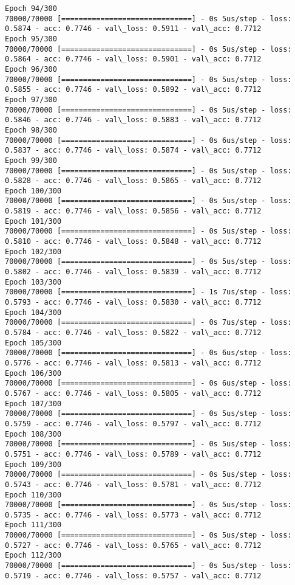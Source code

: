 \documentclass[11pt]{article}
\begin{document}
\begin{Verbatim}[commandchars=\\\{\}]
Epoch 94/300
70000/70000 [==============================] - 0s 5us/step - loss: 0.5874 - acc: 0.7746 - val\_loss: 0.5911 - val\_acc: 0.7712
Epoch 95/300
70000/70000 [==============================] - 0s 5us/step - loss: 0.5864 - acc: 0.7746 - val\_loss: 0.5901 - val\_acc: 0.7712
Epoch 96/300
70000/70000 [==============================] - 0s 5us/step - loss: 0.5855 - acc: 0.7746 - val\_loss: 0.5892 - val\_acc: 0.7712
Epoch 97/300
70000/70000 [==============================] - 0s 5us/step - loss: 0.5846 - acc: 0.7746 - val\_loss: 0.5883 - val\_acc: 0.7712
Epoch 98/300
70000/70000 [==============================] - 0s 6us/step - loss: 0.5837 - acc: 0.7746 - val\_loss: 0.5874 - val\_acc: 0.7712
Epoch 99/300
70000/70000 [==============================] - 0s 5us/step - loss: 0.5828 - acc: 0.7746 - val\_loss: 0.5865 - val\_acc: 0.7712
Epoch 100/300
70000/70000 [==============================] - 0s 5us/step - loss: 0.5819 - acc: 0.7746 - val\_loss: 0.5856 - val\_acc: 0.7712
Epoch 101/300
70000/70000 [==============================] - 0s 5us/step - loss: 0.5810 - acc: 0.7746 - val\_loss: 0.5848 - val\_acc: 0.7712
Epoch 102/300
70000/70000 [==============================] - 0s 5us/step - loss: 0.5802 - acc: 0.7746 - val\_loss: 0.5839 - val\_acc: 0.7712
Epoch 103/300
70000/70000 [==============================] - 1s 7us/step - loss: 0.5793 - acc: 0.7746 - val\_loss: 0.5830 - val\_acc: 0.7712
Epoch 104/300
70000/70000 [==============================] - 0s 7us/step - loss: 0.5784 - acc: 0.7746 - val\_loss: 0.5822 - val\_acc: 0.7712
Epoch 105/300
70000/70000 [==============================] - 0s 6us/step - loss: 0.5776 - acc: 0.7746 - val\_loss: 0.5813 - val\_acc: 0.7712
Epoch 106/300
70000/70000 [==============================] - 0s 6us/step - loss: 0.5767 - acc: 0.7746 - val\_loss: 0.5805 - val\_acc: 0.7712
Epoch 107/300
70000/70000 [==============================] - 0s 5us/step - loss: 0.5759 - acc: 0.7746 - val\_loss: 0.5797 - val\_acc: 0.7712
Epoch 108/300
70000/70000 [==============================] - 0s 5us/step - loss: 0.5751 - acc: 0.7746 - val\_loss: 0.5789 - val\_acc: 0.7712
Epoch 109/300
70000/70000 [==============================] - 0s 5us/step - loss: 0.5743 - acc: 0.7746 - val\_loss: 0.5781 - val\_acc: 0.7712
Epoch 110/300
70000/70000 [==============================] - 0s 5us/step - loss: 0.5735 - acc: 0.7746 - val\_loss: 0.5773 - val\_acc: 0.7712
Epoch 111/300
70000/70000 [==============================] - 0s 5us/step - loss: 0.5727 - acc: 0.7746 - val\_loss: 0.5765 - val\_acc: 0.7712
Epoch 112/300
70000/70000 [==============================] - 0s 5us/step - loss: 0.5719 - acc: 0.7746 - val\_loss: 0.5757 - val\_acc: 0.7712

\end{Verbatim}
\end{document}
